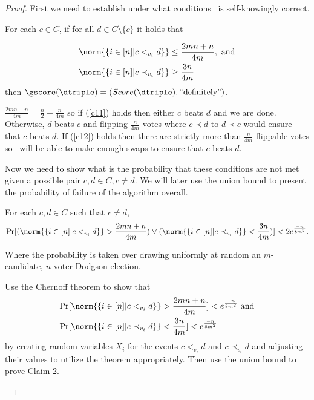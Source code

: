 \begin{proof}
	First we need to establish under what conditions \gscore~is
	self-knowingly correct.
	\begin{claim}
		For each $c \in C$, if for all $d \in C \setminus \{c\}$ it holds
	that

	\begin{align}
	    \norm{\{i \in [n] | c <_{v_i} d\}} &\leq \frac{2mn+n}{4m}, \text{ and}
		\label{c11}\\
	    \norm{\{i \in [n] | c \prec_{v_i} d\}} &\geq \frac{3n}{4m}
		\label{c12}
	\end{align}
	then $\gscore(\dtriple) = (Score(\dtriple), \text{``definitely''})$.

	\end{claim}
	\begin{claimproof}
		$\frac{2mn+n}{4m} = \frac{n}{2} + \frac{n}{4m}$ so if (\ref{c11})
		holds then either $c$ beats $d$ and we are done. Otherwise,
		$d$ beats $c$ and flipping
		$\frac{n}{4m}$ votes where $c \prec d$ to $d \prec c$
		would ensure that $c$ beats $d$.
		If (\ref{c12}) holds then there are strictly more than
		$\frac{n}{4m}$ flippable votes so \gscore~will be able to make enough
		swaps to ensure that $c$ beats $d$.
	\end{claimproof}

	Now we need to show what is the probability that these conditions
	are not met given a possible pair $c,d \in C, c\neq d$.
	We will later use the union bound to present the probability of failure of
	the algorithm overall.
	\begin{claim}
		For each $c,d \in C$ such that $ c\neq d$,
		\[\Pr[(\norm{\{i \in [n] | c <_{v_i} d\}} >
		\frac{2mn+n}{4m}) \vee
		(\norm{\{i \in [n] | c \prec_{v_i} d\}} < \frac{3n}{4m})] <
		2 e^{\frac{-n}{8m^2}}.\]

		Where the probability is taken over
		drawing uniformly at random an $m$-candidate, $n$-voter
		Dodgson election.
	\end{claim}
	\begin{pfsketch}
		Use the Chernoff theorem to show that
		\begin{align}
		\Pr[\norm{\{i \in [n] | c <_{v_i} d\}} &>
		\frac{2mn+n}{4m}] < e^{\frac{-n}{8m^2}} \text{ and} \\
		\Pr[\norm{\{i \in [n] | c \prec_{v_i} d\}} &< \frac{3n}{4m}] <
		e^{\frac{-n}{8m^2}}
		\end{align}
		by creating random variables $X_i$ for the events $c <_{v_i} d$
		and $c \prec_{v_i} d$ and adjusting their values to utilize the
		theorem appropriately.
		Then use the union bound to prove Claim 2.
	\end{pfsketch}


\end{proof}
